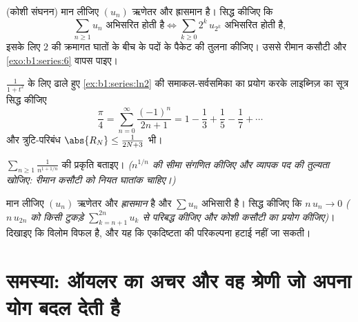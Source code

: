 \begin{exercise}[$\star\star\star$]\label{exo:b1:series:9}
(कोशी संघनन) मान लीजिए $(u_n)$ ऋणेतर और ह्रासमान है। सिद्ध कीजिए कि
\[
\sum_{n \geq 1} u_n \text{ अभिसरित होती है}
\iff
\sum_{k \geq 0} 2^k\, u_{2^k} \text{ अभिसरित होती है},
\]
इसके लिए $2$ की क्रमागत घातों के बीच के पदों के पैकेट की तुलना कीजिए। उससे
रीमान कसौटी और \cref{exo:b1:series:6} वापस पाइए।
\end{exercise}

\begin{exercise}[$\star\star\star$]\label{exo:b1:series:10}
$\frac{1}{1+t^2}$ के लिए ढाले हुए \cref{ex:b1:series:ln2} की समाकल-सर्वसमिका
का प्रयोग करके लाइब्निज़ का सूत्र सिद्ध कीजिए
\[
\frac{\pi}{4} = \sum_{n=0}^{\infty} \frac{(-1)^n}{2n+1}
= 1 - \frac13 + \frac15 - \frac17 + \cdots
\]
और त्रुटि-परिबंध $\abs{R_N} \leq \frac{1}{2N+3}$ भी।
\end{exercise}

\begin{exercise}[$\star\star$]\label{exo:b1:series:11}
$\displaystyle\sum_{n \geq 1} \frac{1}{n^{1 + 1/n}}$ की प्रकृति बताइए।
\emph{($n^{1/n}$ की सीमा संगणित कीजिए और व्यापक पद की तुल्यता खोजिए: रीमान
कसौटी को \emph{नियत} घातांक चाहिए।)}
\end{exercise}

\begin{exercise}[$\star\star\star$]\label{exo:b1:series:12}
मान लीजिए $(u_n)$ ऋणेतर और \emph{ह्रासमान} है और $\sum u_n$ अभिसारी है।
सिद्ध कीजिए कि $n\,u_n \to 0$ \emph{($n\,u_{2n}$ को किसी टुकड़े
$\sum_{k=n+1}^{2n} u_k$ से परिबद्ध कीजिए और कोशी कसौटी का प्रयोग कीजिए)}।
दिखाइए कि विलोम विफल है, और यह कि एकदिष्टता की परिकल्पना हटाई नहीं जा सकती।
\end{exercise}

\section{समस्या: ऑयलर का अचर और वह श्रेणी जो अपना योग बदल देती है}

